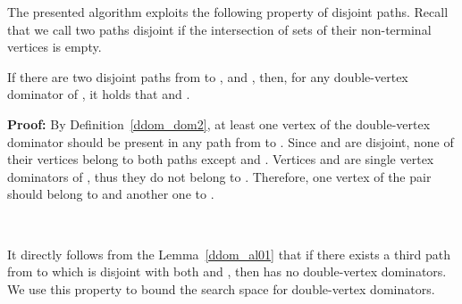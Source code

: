 \documentclass{llncs}
\begin{document}
The presented algorithm exploits the following property of disjoint paths.
Recall that we call two paths disjoint if the intersection of
sets of their non-terminal vertices is empty.

\begin{lemma} \label{ddom_al01}
If there are two disjoint paths from  to
,  and , then, for any double-vertex dominator  of , it
holds that  and .
\end{lemma}
{\bf Proof:} By Definition~\ref{ddom_dom2}, 
at least one vertex of the double-vertex dominator 
should be present in any path from  to .
Since  and  are disjoint,
none of their vertices belong to both paths
except  and . Vertices  and  are single vertex
dominators of , thus they do not belong to . Therefore, one
vertex of the pair  should belong to  and another one to .
\begin{flushright}
 \\
\end{flushright}

It directly follows from the Lemma~\ref{ddom_al01} that 
if there exists a third path from  to
 which is disjoint with both  and , then  has 
no double-vertex dominators. We use this property to
bound the search space for double-vertex dominators.
\end{document}
